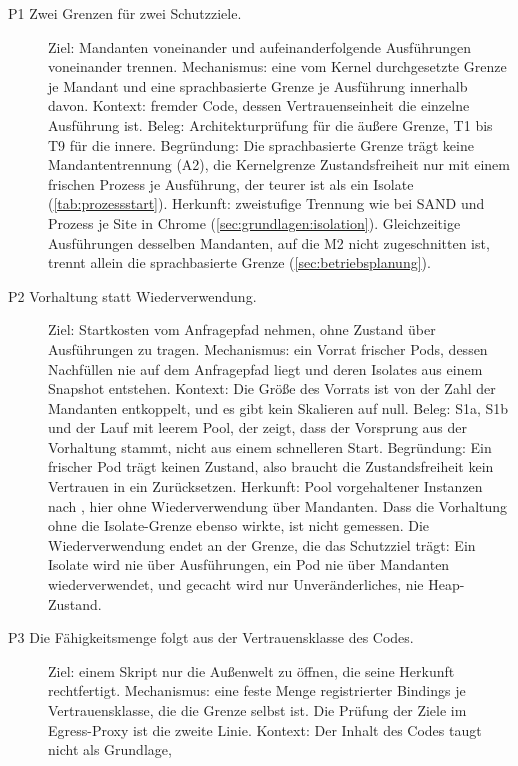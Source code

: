 \begin{description}
  \item[P1 Zwei Grenzen für zwei Schutzziele.] Ziel: Mandanten voneinander und aufeinanderfolgende
    Ausführungen voneinander trennen. Mechanismus: eine vom Kernel durchgesetzte Grenze je Mandant
    und eine sprachbasierte Grenze je Ausführung innerhalb davon. Kontext: fremder Code, dessen
    Vertrauenseinheit die einzelne Ausführung ist. Beleg: Architekturprüfung für die äußere Grenze,
    T1 bis T9 für die innere. Begründung: Die sprachbasierte Grenze trägt keine Mandantentrennung (A2), die Kernelgrenze
    Zustandsfreiheit nur mit einem frischen Prozess je Ausführung, der teurer ist als ein Isolate
    (\autoref{tab:prozessstart}). Herkunft: zweistufige Trennung wie bei SAND
    \autocite[S.~924, 926]{akkus_sand_2018} und Prozess je Site in Chrome (\autoref{sec:grundlagen:isolation}). Gleichzeitige Ausführungen desselben Mandanten, auf die M2 nicht zugeschnitten ist, trennt allein die
    sprachbasierte Grenze (\autoref{sec:betriebsplanung}).
  \item[P2 Vorhaltung statt Wiederverwendung.] Ziel: Startkosten vom Anfragepfad nehmen, ohne
    Zustand über Ausführungen zu tragen. Mechanismus: ein Vorrat frischer Pods, dessen Nachfüllen nie auf dem Anfragepfad liegt und deren
    Isolates aus einem Snapshot entstehen. Kontext: Die Größe des
    Vorrats ist von der Zahl der Mandanten entkoppelt, und es gibt kein Skalieren auf null. Beleg:
    S1a, S1b und der Lauf mit leerem Pool, der zeigt, dass der Vorsprung aus der Vorhaltung
    stammt, nicht aus einem schnelleren Start. Begründung: Ein frischer Pod trägt keinen Zustand, also braucht die
    Zustandsfreiheit kein Vertrauen in ein Zurücksetzen. Herkunft: Pool vorgehaltener Instanzen nach
    \textcite[S.~1]{lin_mitigating_2019}, hier ohne Wiederverwendung über Mandanten. Dass die Vorhaltung ohne die Isolate-Grenze ebenso wirkte, ist nicht
    gemessen. Die Wiederverwendung endet an der Grenze, die das
    Schutzziel trägt: Ein Isolate wird nie über Ausführungen, ein Pod nie über Mandanten
    wiederverwendet, und gecacht wird nur Unveränderliches, nie Heap-Zustand.
  \item[P3 Die Fähigkeitsmenge folgt aus der Vertrauensklasse des Codes.] Ziel: einem Skript nur
    die Außenwelt zu öffnen, die seine Herkunft rechtfertigt. Mechanismus: eine feste Menge
    registrierter Bindings je Vertrauensklasse, die die Grenze selbst ist. Die Prüfung der Ziele im
    Egress-Proxy ist die zweite Linie. Kontext: Der Inhalt des Codes taugt nicht als Grundlage,

\end{description}
